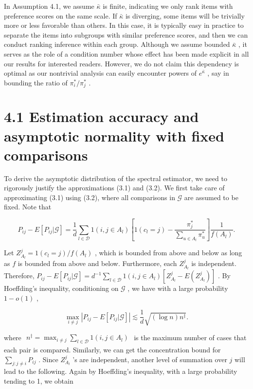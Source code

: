 In Assumption 4.1, we assume \(\bar{\kappa}\) is finite, indicating we
only rank items with preference scores on the same scale. If
\(\bar{\kappa}\) is diverging, some items will be trivially more or less
favorable than others. In this case, it is typically easy in practice to
separate the items into subgroups with similar preference scores, and
then we can conduct ranking inference within each group. Although we
assume bounded \(\bar{\kappa}\) , it serves as the role of a condition
number whose effect has been made explicit in all our results for
interested readers. However, we do not claim this dependency is optimal
as our nontrivial analysis can easily encounter powers of
\(e^{\bar{\kappa}}\) , say in bounding the ratio of
\(\pi_{i}^{*} / \pi_{j}^{*}\) .

\section{4.1 Estimation accuracy and asymptotic normality with fixed
comparisons}\label{estimation-accuracy-and-asymptotic-normality-with-fixed-comparisons}

To derive the asymptotic distribution of the spectral estimator, we need
to rigorously justify the approximations (3.1) and (3.2). We first take
care of approximating (3.1) using (3.2), where all comparisons in
\(\mathcal{G}\) are assumed to be fixed. Note that

\[
P_{ij} - E[P_{ij}|\mathcal{G}] = \frac{1}{d}\sum_{l\in \mathcal{D}}1(i,j\in A_l)\left[1(c_l = j) - \frac{\pi_j^*}{\sum_{u\in A_l}\pi_u^*}\right]\frac{1}{f(A_l)}.
\]

Let \(Z_{A_l}^j = 1(c_l = j) / f(A_l)\) , which is bounded from above
and below as long as \(f\) is bounded from above and below. Furthermore,
each \(Z_{A_l}^j\) is independent. Therefore,
\(P_{ij} - E[P_{ij}|\mathcal{G}] = d^{- 1}\sum_{l\in \mathcal{D}}1(i,j\in A_l)[Z_{A_l}^j - E(Z_{A_l}^j)]\)
. By Hoeffding's inequality, conditioning on \(\mathcal{G}\) , we have
with a large probability \(1 - o(1)\) ,

\[
\max_{i\neq j}\left|P_{ij} - E[P_{ij}|\mathcal{G}]\right|\lesssim \frac{1}{d}\sqrt{(\log n)n^{\ddagger}}.
\]

where
\(\begin{array}{r}{n^{\ddagger} = \max_{i\neq j}\sum_{l\in \mathcal{D}}1(i,j\in A_{l})} \end{array}\)
is the maximum number of cases that each pair is compared. Similarly, we
can get the concentration bound for
\(\textstyle \sum_{j:j\neq i}P_{ij}\) . Since \(Z_{A_{l}}^{j}\) 's are
independent, another level of summation over \(j\) will lead to the
following. Again by Hoeffding's inequality, with a large probability
tending to 1, we obtain

